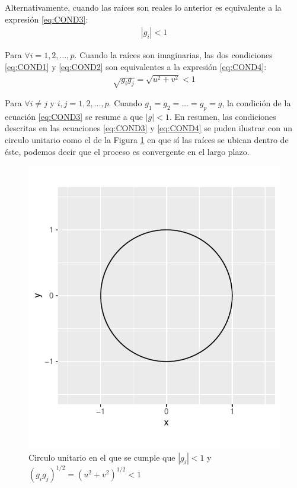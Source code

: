 \documentclass[
]{book}
\begin{document}
Alternativamente, cuando las raíces son reales lo anterior es equivalente a la expresión \eqref{eq:COND3}:
\begin{eqnarray}
    |g_i| < 1
    \label{eq:COND3}
\end{eqnarray}

Para \(\forall i = 1, 2, \ldots, p\). Cuando la raíces son imaginarias, las dos condiciones \eqref{eq:COND1} y \eqref{eq:COND2} son equivalentes a la expresión \eqref{eq:COND4}:
\begin{eqnarray}
    \sqrt{g_i g_j} = \sqrt{u^2 + v^2} < 1 
    \label{eq:COND4}
\end{eqnarray}

Para \(\forall i \neq j\) y \(i, j = 1, 2, \ldots, p\). Cuando \(g_1 = g_2 = \ldots = g_p = g\), la condición de la ecuación \eqref{eq:COND3} se resume a que \(|g| < 1\). En resumen, las condiciones descritas en las ecuaciones \eqref{eq:COND3} y \eqref{eq:COND4} se puden ilustrar con un circulo unitario como el de la Figura \ref{fig:fig24} en que sí las raíces se ubican dentro de éste, podemos decir que el proceso es convergente en el largo plazo.

\begin{figure}

{\centering \includegraphics{bookdown-demo_files/figure-latex/fig24-1} 

}

\caption{Circulo unitario en el que se cumple que $|g_i|<1$ y $(g_i g_j)^{1/2} = (u^2 + v^2)^{1/2} < 1$}\label{fig:fig24}
\end{figure}
\end{document}

